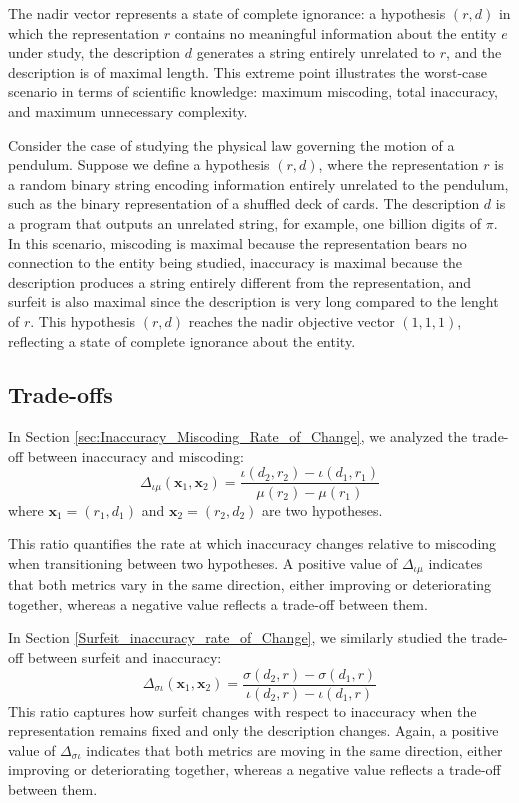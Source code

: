 The nadir vector represents a state of complete ignorance: a hypothesis $(r, d)$ in which the representation $r$ contains no meaningful information about the entity $e$ under study, the description $d$ generates a string entirely unrelated to $r$, and the description is of maximal length. This extreme point illustrates the worst-case scenario in terms of scientific knowledge: maximum miscoding, total inaccuracy, and maximum unnecessary complexity.

\begin{example}
Consider the case of studying the physical law governing the motion of a pendulum. Suppose we define a hypothesis $(r, d)$, where the representation $r$ is a random binary string encoding information entirely unrelated to the pendulum, such as the binary representation of a shuffled deck of cards. The description $d$ is a program that outputs an unrelated string, for example, one billion digits of $\pi$. In this scenario, miscoding is maximal because the representation bears no connection to the entity being studied, inaccuracy is maximal because the description produces a string entirely different from the representation, and surfeit is also maximal since the description is very long compared to the lenght of $r$. This hypothesis $(r, d)$ reaches the nadir objective vector $(1, 1, 1)$, reflecting a state of complete ignorance about the entity.
\end{example}


\subsection*{Trade-offs}

In Section \ref{sec:Inaccuracy_Miscoding_Rate_of_Change}, we analyzed the trade-off between inaccuracy and miscoding:
\[
\Delta_{\iota \mu} ( \mathbf{x}_1, \mathbf{x}_2 ) = \frac{\iota(d_2, r_2) - \iota(d_1, r_1)}{\mu(r_2) - \mu(r_1)}
\]
where $\mathbf{x}_1 = (r_1, d_1)$ and $\mathbf{x}_2 = (r_2, d_2)$ are two hypotheses.

This ratio quantifies the rate at which inaccuracy changes relative to miscoding when transitioning between two hypotheses. A positive value of $\Delta_{\iota \mu}$ indicates that both metrics vary in the same direction, either improving or deteriorating together, whereas a negative value reflects a trade-off between them.

In Section \ref{Surfeit_inaccuracy_rate_of_Change}, we similarly studied the trade-off between surfeit and inaccuracy:
\[
\Delta_{\sigma \iota} ( \mathbf{x}_1, \mathbf{x}_2 ) = \frac{\sigma(d_2, r) - \sigma(d_1, r)}{\iota(d_2, r) - \iota(d_1, r)}
\]
This ratio captures how surfeit changes with respect to inaccuracy when the representation remains fixed and only the description changes. Again, a positive value of $\Delta_{\sigma \iota}$ indicates that both metrics are moving in the same direction, either improving or deteriorating together, whereas a negative value reflects a trade-off between them.


